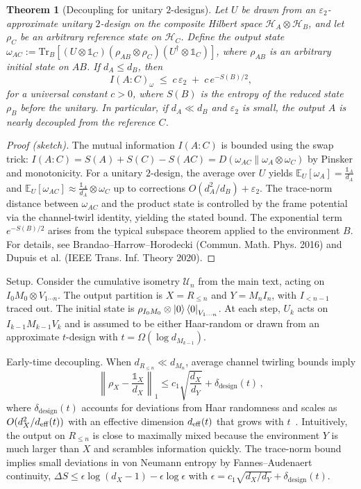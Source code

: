 \documentclass[a4paper,11pt]{article}
\newcommand{\mathbbm}[1]{\mathbb{#1}}
\theoremstyle{plain}
\newtheorem{theorem}{Theorem}
\theoremstyle{definition}
\theoremstyle{remark}
\begin{document}
\begin{theorem}[Decoupling for unitary $2$-designs]\label{thm:decoupling-design}
Let $U$ be drawn from an $\varepsilon_2$-approximate unitary $2$-design on the composite Hilbert space $\mathcal{H}_A\otimes\mathcal{H}_B$, and let $\rho_C$ be an arbitrary reference state on $\mathcal{H}_C$. Define the output state $\omega_{AC}:= \mathrm{Tr}_B[(U\otimes\mathbbm{1}_C)(\rho_{AB}\otimes\rho_C)(U^\dagger\otimes\mathbbm{1}_C)]$, where $\rho_{AB}$ is an arbitrary initial state on $AB$. If $d_A\le d_B$, then
\begin{equation}
I(A:C)_\omega \;\le\; c\,\varepsilon_2 \;+\; c\,e^{-S(B)/2},
\end{equation}
for a universal constant $c>0$, where $S(B)$ is the entropy of the reduced state $\rho_B$ before the unitary. In particular, if $d_A\ll d_B$ and $\varepsilon_2$ is small, the output $A$ is nearly decoupled from the reference $C$.
\end{theorem}
\begin{proof}[Proof (sketch)]
The mutual information $I(A:C)$ is bounded using the swap trick: $I(A:C)=S(A)+S(C)-S(AC)=D(\omega_{AC}\|\omega_A\otimes\omega_C)$ by Pinsker and monotonicity. For a unitary $2$-design, the average over $U$ yields $\mathbb{E}_U[\omega_A]=\frac{\mathbbm{1}_A}{d_A}$ and $\mathbb{E}_U[\omega_{AC}]\approx\frac{\mathbbm{1}_A}{d_A}\otimes\omega_C$ up to corrections $O(d_A^2/d_B)+\varepsilon_2$. The trace-norm distance between $\omega_{AC}$ and the product state is controlled by the frame potential via the channel-twirl identity, yielding the stated bound. The exponential term $e^{-S(B)/2}$ arises from the typical subspace theorem applied to the environment $B$. For details, see Brandao--Harrow--Horodecki (Commun. Math. Phys. 2016) and Dupuis et al. (IEEE Trans. Inf. Theory 2020).
\end{proof}

Setup. Consider the cumulative isometry $\mathcal{U}_n$ from the main text, acting on $I_0 M_0 \otimes V_{1\cdots n}$. The output partition is $X=R_{\le n}$ and $Y=M_n I_n$, with $I_{<n-1}$ traced out. The initial state is $\rho_{I_0M_0}\otimes \left|0\right\rangle\left\langle0\right|_{V_{1\cdots n}}$. At each step, $U_k$ acts on $I_{k-1}M_{k-1}V_k$ and is assumed to be either Haar-random or drawn from an approximate $t$-design with $t=\Omega(\log d_{M_{k-1}})$.

Early-time decoupling. When $d_{R_{\le n}}\ll d_{M_n}$, average channel twirling bounds imply 
\begin{equation}
\left\|\rho_{X} - \frac{\mathbbm{1}_X}{d_X}\right\|_1 \le c_1 \sqrt{\frac{d_X}{d_Y}} + \delta_{\text{design}}(t)\,,
\end{equation}
where $\delta_{\text{design}}(t)$ accounts for deviations from Haar randomness and scales as $O(d_X^2/d_{\rm eff}(t))$ with an effective dimension $d_{\rm eff}(t)$ that grows with $t$~\cite{Brandao:2016}. Intuitively, the output on $R_{\le n}$ is close to maximally mixed because the environment $Y$ is much larger than $X$ and scrambles information quickly. The trace-norm bound implies small deviations in von Neumann entropy by Fannes--Audenaert continuity, $\Delta S \le \epsilon \log (d_X-1)-\epsilon \log \epsilon$ with $\epsilon=c_1\sqrt{d_X/d_Y}+\delta_{\text{design}}(t)$.
\end{document}
